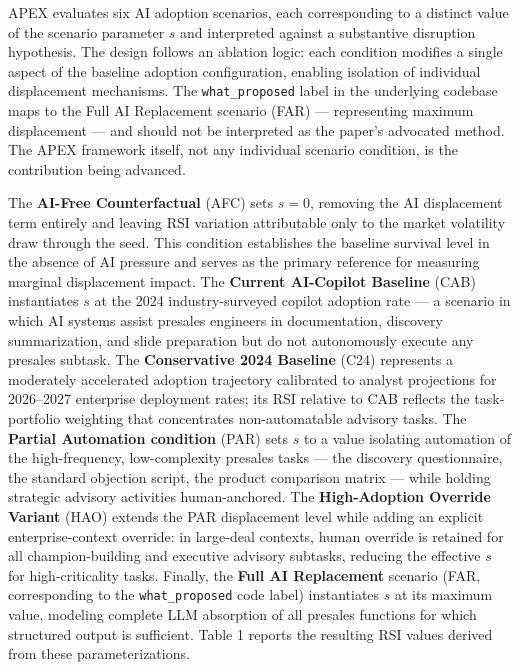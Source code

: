 \documentclass[10pt, conference]{IEEEtran}
\begin{document}
\label{sec:experimental_conditions_and_scenario_par}

APEX evaluates six AI adoption scenarios, each corresponding to a distinct value of the scenario parameter $s$ and interpreted against a substantive disruption hypothesis. The design follows an ablation logic: each condition modifies a single aspect of the baseline adoption configuration, enabling isolation of individual displacement mechanisms. The \texttt{what\_proposed} label in the underlying codebase maps to the Full AI Replacement scenario (FAR) --- representing maximum displacement --- and should not be interpreted as the paper's advocated method. The APEX framework itself, not any individual scenario condition, is the contribution being advanced.

The \textbf{AI-Free Counterfactual} (AFC) sets $s = 0$, removing the AI displacement term entirely and leaving RSI variation attributable only to the market volatility draw through the seed. This condition establishes the baseline survival level in the absence of AI pressure and serves as the primary reference for measuring marginal displacement impact. The \textbf{Current AI-Copilot Baseline} (CAB) instantiates $s$ at the 2024 industry-surveyed copilot adoption rate --- a scenario in which AI systems assist presales engineers in documentation, discovery summarization, and slide preparation but do not autonomously execute any presales subtask. The \textbf{Conservative 2024 Baseline} (C24) represents a moderately accelerated adoption trajectory calibrated to analyst projections for 2026--2027 enterprise deployment rates; its RSI relative to CAB reflects the task-portfolio weighting that concentrates non-automatable advisory tasks. The \textbf{Partial Automation condition} (PAR) sets $s$ to a value isolating automation of the high-frequency, low-complexity presales tasks --- the discovery questionnaire, the standard objection script, the product comparison matrix --- while holding strategic advisory activities human-anchored. The \textbf{High-Adoption Override Variant} (HAO) extends the PAR displacement level while adding an explicit enterprise-context override: in large-deal contexts, human override is retained for all champion-building and executive advisory subtasks, reducing the effective $s$ for high-criticality tasks. Finally, the \textbf{Full AI Replacement} scenario (FAR, corresponding to the \texttt{what\_proposed} code label) instantiates $s$ at its maximum value, modeling complete LLM absorption of all presales functions for which structured output is sufficient. Table 1 reports the resulting RSI values derived from these parameterizations.
\end{document}
